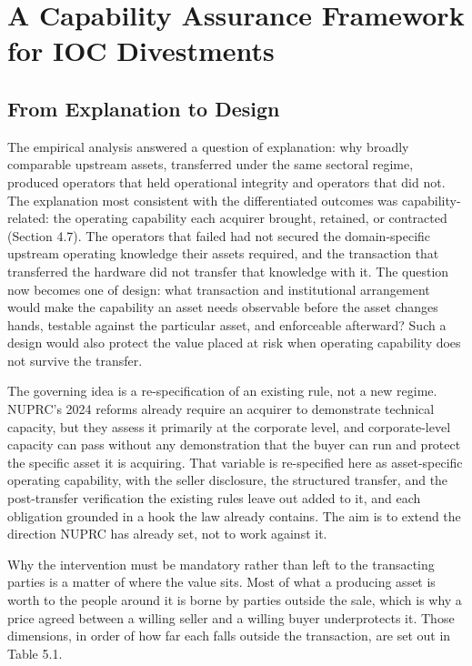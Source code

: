 \hypertarget{a-capability-assurance-framework-for-ioc-divestments}{%
\chapter{A Capability Assurance Framework for IOC
Divestments}\label{a-capability-assurance-framework-for-ioc-divestments}}

\hypertarget{from-explanation-to-design}{%
\section{From Explanation to Design}\label{from-explanation-to-design}}

The empirical analysis answered a question of explanation: why broadly
comparable upstream assets, transferred under the same sectoral regime,
produced operators that held operational integrity and operators that
did not. The explanation most consistent with the differentiated
outcomes was capability-related: the operating capability each acquirer
brought, retained, or contracted (Section 4.7). The operators that
failed had not secured the domain-specific upstream operating knowledge
their assets required, and the transaction that transferred the hardware
did not transfer that knowledge with it. The question now becomes one of
design: what transaction and institutional arrangement would make the
capability an asset needs observable before the asset changes hands,
testable against the particular asset, and enforceable afterward? Such a
design would also protect the value placed at risk when operating
capability does not survive the transfer.

The governing idea is a re-specification of an existing rule, not a new
regime. NUPRC's 2024 reforms already require an acquirer to demonstrate
technical capacity, but they assess it primarily at the corporate level,
and corporate-level capacity can pass without any demonstration that the
buyer can run and protect the specific asset it is acquiring. That
variable is re-specified here as asset-specific operating capability,
with the seller disclosure, the structured transfer, and the
post-transfer verification the existing rules leave out added to it, and
each obligation grounded in a hook the law already contains. The aim is
to extend the direction NUPRC has already set, not to work against it.

Why the intervention must be mandatory rather than left to the
transacting parties is a matter of where the value sits. Most of what a
producing asset is worth to the people around it is borne by parties
outside the sale, which is why a price agreed between a willing seller
and a willing buyer underprotects it. Those dimensions, in order of how
far each falls outside the transaction, are set out in Table 5.1.

